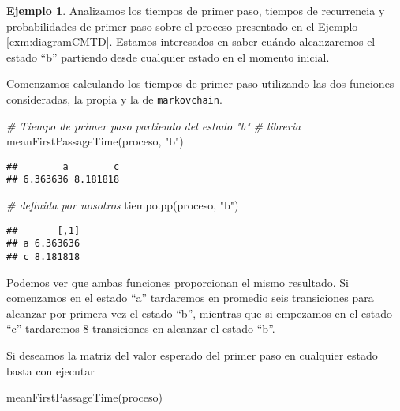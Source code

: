 \documentclass[
]{book}
\newenvironment{Shaded}{\begin{snugshade}}{\end{snugshade}}
\newcommand{\CommentTok}[1]{\textcolor[rgb]{0.56,0.35,0.01}{\textit{#1}}}
\newcommand{\FunctionTok}[1]{\textcolor[rgb]{0.00,0.00,0.00}{#1}}
\newcommand{\NormalTok}[1]{#1}
\newcommand{\StringTok}[1]{\textcolor[rgb]{0.31,0.60,0.02}{#1}}
\theoremstyle{definition}
\theoremstyle{definition}
\newtheorem{example}{Ejemplo}[chapter]
\theoremstyle{definition}
\theoremstyle{definition}
\theoremstyle{remark}
\begin{document}
\begin{example}
Analizamos los tiempos de primer paso, tiempos de recurrencia y probabilidades de primer paso sobre el proceso presentado en el Ejemplo \ref{exm:diagramCMTD}. Estamos interesados en saber cuándo alcanzaremos el estado ``b'' partiendo desde cualquier estado en el momento inicial.
\end{example}

Comenzamos calculando los tiempos de primer paso utilizando las dos funciones consideradas, la propia y la de \texttt{markovchain}.

\begin{Shaded}
\begin{Highlighting}[]
\CommentTok{\# Tiempo de primer paso partiendo del estado "b"}
\CommentTok{\# libreria}
\FunctionTok{meanFirstPassageTime}\NormalTok{(proceso, }\StringTok{"b"}\NormalTok{)}
\end{Highlighting}
\end{Shaded}

\begin{verbatim}
##        a        c 
## 6.363636 8.181818
\end{verbatim}

\begin{Shaded}
\begin{Highlighting}[]
\CommentTok{\# definida por nosotros}
\FunctionTok{tiempo.pp}\NormalTok{(proceso, }\StringTok{"b"}\NormalTok{)}
\end{Highlighting}
\end{Shaded}

\begin{verbatim}
##       [,1]
## a 6.363636
## c 8.181818
\end{verbatim}

Podemos ver que ambas funciones proporcionan el mismo resultado. Si comenzamos en el estado ``a'' tardaremos en promedio seis transiciones para alcanzar por primera vez el estado ``b'', mientras que si empezamos en el estado ``c'' tardaremos 8 transiciones en alcanzar el estado ``b''.

Si deseamos la matriz del valor esperado del primer paso en cualquier estado basta con ejecutar

\begin{Shaded}
\begin{Highlighting}[]
\FunctionTok{meanFirstPassageTime}\NormalTok{(proceso)}
\end{Highlighting}
\end{Shaded}
\end{document}
